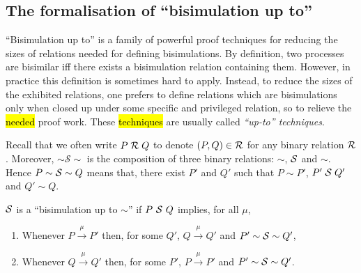 \subsection{The formalisation of ``bisimulation up to''}

``Bisimulation up to'' is a family of powerful proof techniques
for reducing the sizes of relations needed for defining bisimulations.
By definition, two processes are bisimilar iff there exists a
bisimulation relation containing them. However, in practice
this definition is sometimes  hard to apply. Instead, to reduce
the sizes of the exhibited relations, one prefers to define relations
which are bisimulations only when closed up under some specific and
privileged relation, so to relieve the \hl{needed} proof work. These
\hl{techniques} are usually called \emph{``up-to'' techniques}.

Recall that we often write $P \;\R\; Q$ to denote
$(P, Q) \in \R$ for any binary relation $\R$. 
Moreover, 
 $\sim \mathcal{S} \sim$ is the composition of three binary
relations: $\sim$, $\S$ and $\sim$. Hence $P \sim \S \sim Q$ means that,
there exist $P'$ and $Q'$ such that $P \sim P'$, $P' \;\S\; Q'$ and $Q' \sim Q$.
\begin{definition}%
  \label{def:bisimUptoSim}
$\S$ is a ``bisimulation up to $\sim$'' if $P\ \S\ Q$ implies, for all $\mu$,
\begin{enumerate}
\item Whenever $P \overset{\mu}{\rightarrow} P'$ then, for some
  $Q'$, $Q \overset{\mu}{\rightarrow} Q'$ and $P' \sim \S
  \sim Q'$,
\item Whenever $Q \overset{\mu}{\rightarrow} Q'$ then, for some
  $P'$, $P \overset{\mu}{\rightarrow} P'$ and $P' \sim \S
  \sim Q'$.
\end{enumerate}
\end{definition}


